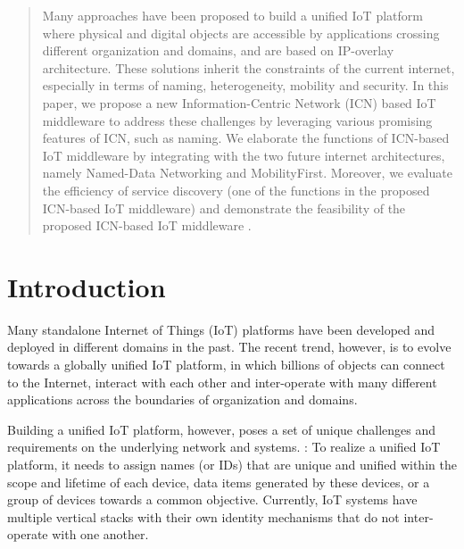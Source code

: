 \begin{abstract}
Many approaches have been proposed to build a unified IoT platform where physical and digital objects are accessible by applications crossing different organization and domains, and are based on IP-overlay architecture.
These solutions inherit the constraints of the current internet, especially in terms of naming, heterogeneity, mobility and security.
In this paper, we propose a new Information-Centric Network (ICN) based IoT middleware to address these challenges by leveraging various promising features of ICN, such as naming. We elaborate the functions of ICN-based IoT middleware by integrating with the two future internet architectures, namely Named-Data Networking and MobilityFirst. Moreover, we evaluate the efficiency of service discovery (one of the functions in the proposed ICN-based IoT middleware) and demonstrate the feasibility of the proposed ICN-based IoT middleware .
\end{abstract}

\section{Introduction}
Many standalone Internet of Things (IoT) platforms have been developed and deployed in different domains in the past. The recent trend, however, is to evolve towards a globally unified IoT platform, in which billions of objects can connect to the Internet, interact with each other and inter-operate with many different applications  across the boundaries of organization and domains.


Building a unified IoT platform, however, poses a set of unique challenges and requirements on the underlying network and systems.
:
To realize a unified IoT platform, 
it needs to assign names (or IDs) that are unique and unified within the scope and lifetime of each device, data items generated by these devices, or a group of devices towards a common objective. Currently, IoT systems have multiple vertical stacks with their own identity mechanisms that do not inter-operate with one another.

